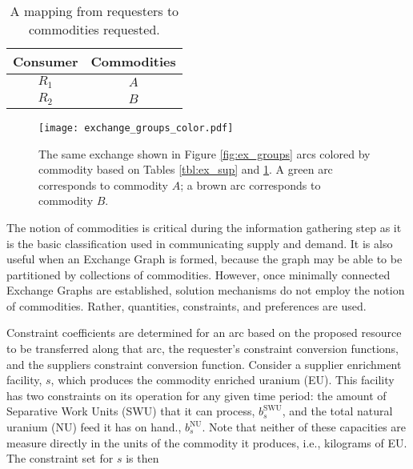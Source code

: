 \begin{table}[h]
\centering
\begin{tabular}{c|c}
Consumer & Commodities \\ \hline
$R_1$             & $A$         \\
$R_2$             & $B$        
\end{tabular}
\caption{A mapping from requesters to commodities requested.}
\label{tbl:ex_req}
\end{table}

\begin{figure}
  \begin{center}
    \texttt{[image: exchange\_groups\_color.pdf]}
    \caption{The same exchange shown in Figure \ref{fig:ex_groups} arcs colored
      by commodity based on Tables \ref{tbl:ex_sup} and \ref{tbl:ex_req}. A green
      arc corresponds to commodity $A$; a brown arc corresponds to commodity
      $B$.}
    \label{fig:ex_groups_color}
  \end{center}
\end{figure}

The notion of commodities is critical during the information gathering step as
it is the basic classification used in communicating supply and demand. It is
also useful when an Exchange Graph is formed, because the graph may be able to
be partitioned by collections of commodities. However, once minimally connected
Exchange Graphs are established, solution mechanisms do not employ the notion of
commodities. Rather, quantities, constraints, and preferences are used.


Constraint coefficients are determined for an arc based on the proposed resource
to be transferred along that arc, the requester's constraint conversion
functions, and the suppliers constraint conversion function. Consider a supplier
enrichment facility, $s$, which produces the commodity enriched uranium
(EU). This facility has two constraints on its operation for any given time
period: the amount of Separative Work Units (SWU) that it can process,
$b_{s}^{\text{SWU}}$, and the total natural uranium (NU) feed it has on hand.,
$b_{s}^{\text{NU}}$.  Note that neither of these capacities are measure directly in the
units of the commodity it produces, i.e., kilograms of EU. The constraint set
for $s$ is then
 

